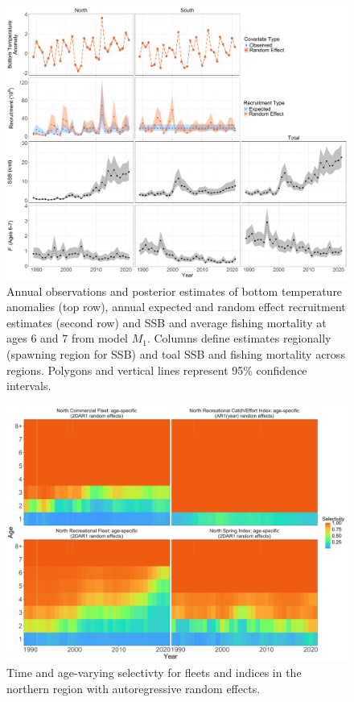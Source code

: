 \documentclass[
]{article}
\begin{document}
\begin{figure}

{\centering \includegraphics[height=0.95\textheight]{E_R_SSB_F_fig} 

}

\caption{Annual observations and posterior estimates of bottom temperature anomalies (top row), annual expected and random effect recruitment estimates (second row) and SSB and average fishing mortality at ages 6 and 7 from model $M_1$. Columns define estimates regionally (spawning region for SSB) and toal SSB and fishing mortality across regions. Polygons and vertical lines represent 95\% confidence intervals.}\label{fig:E-R-SSB-F}
\end{figure}
\pagebreak

\begin{figure}

{\centering \includegraphics[height=0.95\textheight]{selectivity_re_plot} 

}

\caption{Time and age-varying selectivty for fleets and indices in the northern region with autoregressive random effects.}\label{fig:selectivity-re}
\end{figure}
\pagebreak
\end{document}
